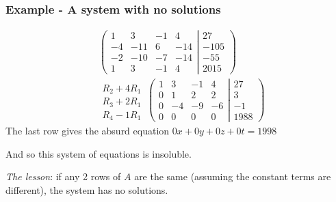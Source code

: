 \documentclass[usenames,dvipsnames,aspectratio=169,10pt]{beamer}
\numberwithin{equation}{section}
\begin{document}
\begin{frame}
\frametitle{Example - A system with no solutions}
\begin{align*}
&
\left(
	\begin{matrix}
	   1 &   3 &  -1 &   4 \\
	  -4 & -11 &   6 & -14 \\
	  -2 & -10 &  -7 & -14 \\
	   1 &   3 &  -1 &   4
	\end{matrix}
  \left|
	\begin{matrix}
	    27 \\
	  -105 \\
	   -55 \\
	  2015
	\end{matrix}
  \right.
\right) \\
&
\begin{array}{l}
   \\
 R_2 + 4R_1 \\
 R_3 + 2R_1 \\
 R_4 - 1R_1
\end{array}
\,
\left(
	\begin{matrix}
	   1 &   3 &  -1 &   4 \\
	   0 &   1 &   2 &   2 \\
	   0 &  -4 &  -9 &  -6 \\
	   0 &   0 &   0 &   0
	\end{matrix}
  \left|
	\begin{matrix}
	    27 \\
	     3 \\
	    -1 \\
	  1988
	\end{matrix}
  \right.
\right)
\end{align*}
The last row gives the absurd equation $0x + 0y + 0z + 0t = 1998$

And so this system of equations is insoluble.

\textit{The lesson}: if any 2 rows of $A$ are the same (assuming the constant terms are different), the system has no solutions.

\end{frame}
\end{document}
